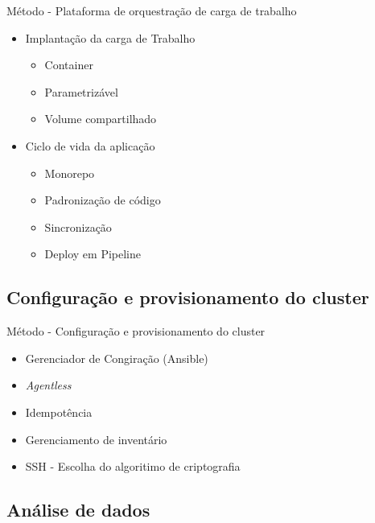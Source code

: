 \documentclass[10pt,brazil]{beamer}
\theoremstyle{definition}
\begin{document}
\begin{frame}{Método - Plataforma de orquestração de carga de trabalho}
  \begin{itemize}
    \item Implantação da carga de Trabalho
          \begin{itemize}
            \item Container
            \item Parametrizável
            \item Volume compartilhado
          \end{itemize}
    \item Ciclo de vida da aplicação
          \begin{itemize}
            \item Monorepo %
            \item Padronização de código
            \item Sincronização
            \item Deploy em Pipeline
          \end{itemize}
  \end{itemize}
\end{frame}

\subsection{Configuração e provisionamento do cluster}

\begin{frame}{Método - Configuração e provisionamento do cluster}
  \begin{itemize}
    \item Gerenciador de Congiração (Ansible\textregistered)
    \item \emph{Agentless}
    \item Idempotência
    \item Gerenciamento de inventário
    \item SSH - Escolha do algoritimo de criptografia %
  \end{itemize}
\end{frame}

\subsection{Análise de dados}
\end{document}
